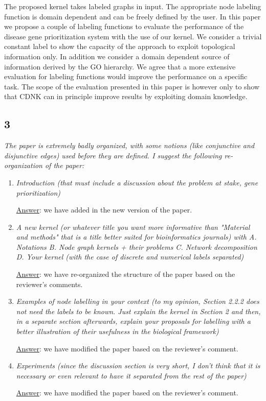 \documentclass[11pt]{article}
\begin{document}
The proposed kernel takes labeled graphs in input. The appropriate node labeling function is domain dependent and can be freely defined by the user. In this paper we propose a couple of labeling functions to evaluate the performance of the disease gene prioritization system with the use of our kernel. We consider a trivial constant label to show the capacity of the approach to exploit topological information only. In addition we consider a domain dependent source of information derived by the GO hierarchy. We agree that a more extensive evaluation for labeling functions would improve the performance on a specific task. The scope of the evaluation presented in this paper is however only to show that CDNK can in principle improve results by exploiting domain knowledge.


\subsection*{3} \textit{The paper is extremely badly organized, with some notions (like conjunctive and disjunctive edges) used before they are defined. I suggest the following re-organization of the paper:}

\begin{enumerate}
\item \textit{Introduction (that must include a discussion about the problem at stake, gene prioritization)}

\underline{Answer}: we have added in the new version of the paper.

\item \textit{A new kernel (or whatever title you want more informative than "Material and methods" that is a title better suited for bioinformatics journals) with A. Notations B. Node graph kernels + their problems C. Network decomposition D. Your kernel (with the case of discrete and numerical labels separated)}

\underline{Answer}: we have re-organized the structure of the paper based on the reviewer's comments.

\item \textit{Examples of node labelling in your context (to my opinion, Section 2.2.2 does not need the labels to be known. Just explain the kernel in Section 2 and then, in a separate section afterwards, explain your proposals for labelling with a better illustration of their usefulness in the biological framework)}

\underline{Answer}: we have modified the paper based on the reviewer's comment.

\item \textit{Experiments (since the discussion section is very short, I don't think that it is necessary or even relevant to have it separated from the rest of the paper)}

\underline{Answer}: we have modified the paper based on the reviewer's comment.

\end{enumerate}
\end{document}
